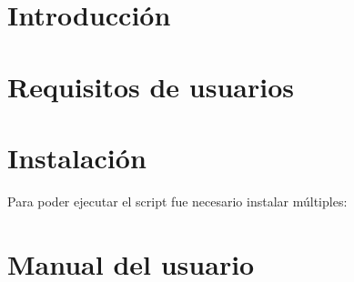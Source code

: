 
\section{Introducción}

\section{Requisitos de usuarios}

\section{Instalación}

Para poder ejecutar el script fue necesario instalar múltiples:

\section{Manual del usuario}


